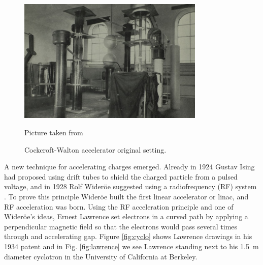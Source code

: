\begin{figure}
\centering
 \begin{minipage}{\textwidth}
 \centering
  \includegraphics[width=3.5in]{Pictures/cockroft.jpg}
  \caption{\label{fig:cock}
   	Cockcroft-Walton accelerator original setting.}
   	\footnotesize{Picture taken from \citep{Cockcroft619}}
   \end{minipage}
\end{figure}
A new technique for accelerating charges emerged. Already in 1924 Gustav Ising
had proposed using drift tubes to shield the charged particle from a pulsed
voltage\cite{Ising}, and in 1928 Rolf Wider\"oe suggested using a radiofrequency
(RF) system \cite{Wideroe1928}. To prove this principle Wider\"oe built the
first linear accelerator or linac, and RF acceleration was born.
Using the RF acceleration principle and one of Wider\"oe's ideas, Ernest
Lawrence set electrons in a curved path by applying a perpendicular magnetic
field so that the electrons would pass several times through and accelerating
gap. Figure \ref{fig:cyclo} shows Lawrence drawings in his 1934 patent and in
Fig. \ref{fig:lawrence} we see Lawrence standing next to his \SI{1.5}{m}
diameter cyclotron in the University of California at Berkeley.
